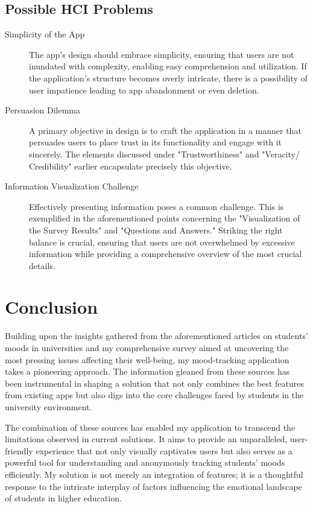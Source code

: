 \documentclass[11pt]{report}
\begin{document}
\subsection{Possible HCI Problems}

\begin{description}
    
    \item[Simplicity of the App] The app's design should embrace simplicity, ensuring that users are not inundated with complexity, enabling easy comprehension and utilization. If the application's structure becomes overly intricate, there is a possibility of user impatience leading to app abandonment or even deletion.

    \item[Persuasion Dilemma] A primary objective in design is to craft the application in a manner that persuades users to place trust in its functionality and engage with it sincerely. The elements discussed under "Trustworthiness" and "Veracity/ Credibility" earlier encapsulate precisely this objective.

    \item[Information Visualization Challenge] Effectively presenting information poses a common challenge. This is exemplified in the aforementioned points concerning the "Visualization of the Survey Results" and "Questions and Answers." Striking the right balance is crucial, ensuring that users are not overwhelmed by excessive information while providing a comprehensive overview of the most crucial details.
    
\end{description}

\section{Conclusion}

Building upon the insights gathered from the aforementioned articles on students' moods in universities and my comprehensive survey aimed at uncovering the most pressing issues affecting their well-being, my mood-tracking application takes a pioneering approach. The information gleaned from these sources has been instrumental in shaping a solution that not only combines the best features from existing apps but also digs into the core challenges faced by students in the university environment.
\newline

The combination of these sources has enabled my application to transcend the limitations observed in current solutions. It aims to provide an unparalleled, user-friendly experience that not only visually captivates users but also serves as a powerful tool for understanding and anonymously tracking students' moods efficiently. My solution is not merely an integration of features; it is a thoughtful response to the intricate interplay of factors influencing the emotional landscape of students in higher education.
\newline
\end{document}
